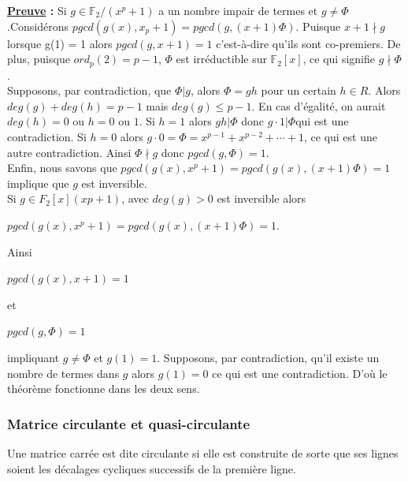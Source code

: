 \documentclass[12pt,openany]{report}
\begin{document}
\textbf{\underline{Preuve} :} Si $g \in \mathbb{F}_2/(x^p+1)$ a un nombre impair de termes et $g\neq \Phi$.Considérons
$ pgcd (g(x), x_p + 1) = pgcd (g,(x + 1)\Phi)$. Puisque $x+1\nmid g$ lorsque g(1) = 1 alors $pgcd(g, x+1) = 1$
c'est-à-dire qu'ils sont co-premiers. De plus, puisque $ord_p(2) = p-1$, $\Phi$ est irréductible sur $\mathbb{F}_2[x]$, ce qui
signifie $g\nmid \Phi$.\\
Supposons, par contradiction, que $\Phi | g$, alors $\Phi = gh$ pour un certain $h \in \mathit{R}$. Alors
$deg(g)+ deg(h) = p-1 $\hspace{0.2cm} mais $deg(g)\leq p-1$. En cas d'égalité, on aurait
$deg(h) = 0$ ou $h = 0$ ou $1$. Si $h = 1$ alors $gh | \Phi$ donc $g\cdot 1 | \Phi $qui est une contradiction. Si
$h = 0$ alors $g \cdot 0 = \Phi = x^{p-1} + x^{p-2} +\cdots + 1$, ce qui est une autre contradiction. Ainsi
$\Phi\nmid g$ donc $pgcd (g, \Phi) = 1$.\\

Enfin, nous savons que $pgcd (g(x), x^p + 1) = pgcd (g(x),(x + 1)\Phi) = 1$ implique que $g$
est inversible.\\
Si $g \in  \mathit{F}_2[x]( x
p + 1)$, avec $deg(g) > 0$ est inversible alors\\
\begin{center}
$pgcd (g(x), x^p + 1) = pgcd (g(x),(x + 1)\Phi) = 1$.
\end{center}

Ainsi\\
\begin{center}
 $pgcd (g(x), x + 1) = 1$
\end{center}

et
\begin{center}
 $pgcd (g, \Phi) = 1$
\end{center}

impliquant $g\neq \Phi$ et $g(1) = 1$. Supposons, par contradiction, qu'il existe un
nombre de termes dans $g$ alors $g(1) = 0$ ce qui est une contradiction. D'où le théorème
fonctionne dans les deux sens.
\subsubsection{Matrice circulante et quasi-circulante}

Une matrice carrée est dite circulante si elle est construite de sorte que ses lignes soient les décalages cycliques successifs de la première ligne.
\end{document}
